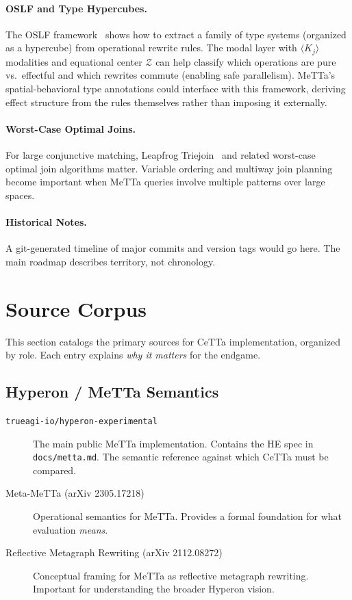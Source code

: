 \documentclass[11pt]{article}
\newcommand{\code}[1]{\texttt{#1}}
\newcommand{\HE}{\textup{HE}}
\newcommand{\CeTTa}{\textup{CeTTa}}
\begin{document}
\paragraph{OSLF and Type Hypercubes.}
The OSLF framework~\cite{OSLF2026} shows how to extract a family of type
systems (organized as a hypercube) from operational rewrite rules.  The
modal layer with $\langle K_j \rangle$ modalities and equational center
$\mathcal{Z}$ can help classify which operations are pure vs.\ effectful
and which rewrites commute (enabling safe parallelism).  MeTTa's
spatial-behavioral type annotations could interface with this framework,
deriving effect structure from the rules themselves rather than imposing
it externally.

\paragraph{Worst-Case Optimal Joins.}
For large conjunctive matching, Leapfrog Triejoin~\cite{Veldhuizen2014}
and related worst-case optimal join algorithms matter.  Variable ordering
and multiway join planning become important when MeTTa queries involve
multiple patterns over large spaces.

\paragraph{Historical Notes.}
A git-generated timeline of major commits and version tags would go here.
The main roadmap describes territory, not chronology.

\section{Source Corpus}
\label{sec:sources}

This section catalogs the primary sources for \CeTTa{} implementation,
organized by role.  Each entry explains \emph{why it matters} for the
endgame.

\subsection{Hyperon / MeTTa Semantics}

\begin{description}
\item[\code{trueagi-io/hyperon-experimental}]
  The main public MeTTa implementation.  Contains the \HE{} spec in
  \code{docs/metta.md}.  The semantic reference against which \CeTTa{}
  must be compared.

\item[Meta-MeTTa (arXiv 2305.17218)]
  Operational semantics for MeTTa.  Provides a formal foundation for
  what evaluation \emph{means}.

\item[Reflective Metagraph Rewriting (arXiv 2112.08272)]
  Conceptual framing for MeTTa as reflective metagraph rewriting.
  Important for understanding the broader Hyperon vision.
\end{description}
\end{document}
